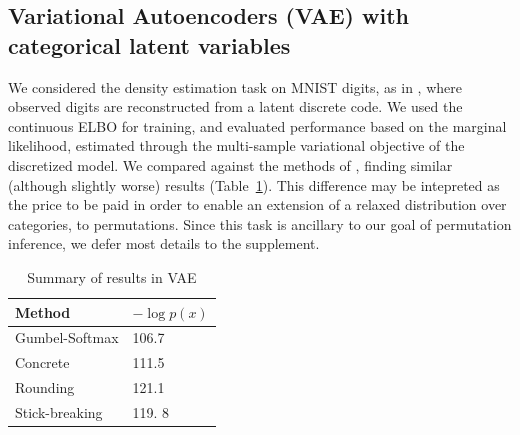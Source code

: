 \documentclass[twoside]{article}
\begin{document}
\subsection*{Variational Autoencoders (VAE) with categorical latent variables}
We considered the density estimation task on MNIST digits, as in
\cite{maddison2016concrete, jang2016categorical}, where observed
digits are reconstructed from a latent discrete code. We used the
continuous ELBO for training, and evaluated performance based on the
marginal likelihood, estimated through the multi-sample variational
objective of the discretized model. We compared against the methods of
\cite{jang2016categorical, maddison2016concrete}, finding similar
(although slightly worse) results (Table~\ref{tab:vae}). This difference may be
intepreted as the price to be paid in order to enable an extension of
a relaxed distribution over categories, to permutations.  Since this
task is ancillary to our goal of permutation inference, we defer most
details to the supplement.
\begin{table}[h]
  \caption{Summary of results in VAE}
  \label{tab:vae}
  \centering
  \begin{tabular}{ll}
    \textbf{Method} & $- \log p(x)$ \\
    \hline
    Gumbel-Softmax    & 106.7 \\
    Concrete  &  111.5\\
    Rounding &  121.1 \\
    Stick-breaking & 119. 8\\
    \bottomrule
  \end{tabular}
\end{table}


   
\end{document}

